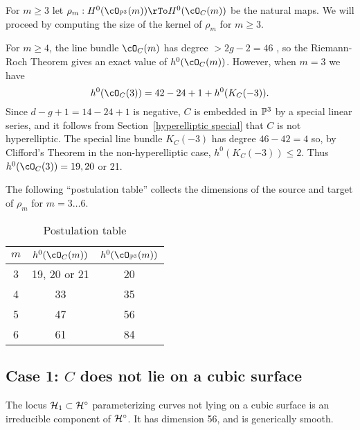 For $m\geq 3$ let
$
\rho_m : H^0(\cO_{\PP^3}(m)) \rTo H^0(\cO_C(m))
$
be the natural maps.
We will proceed by computing the size of the kernel of $\rho_m$ for $m\geq 3$.

For $m \geq 4$, the line bundle $\cO_C(m)$ has degree $>2g-2 = 46$ , so the Riemann-Roch Theorem gives an exact value of $h^0(\cO_C(m))$.
However, when $m= 3$ we have 
$$
h^0(\cO_C(3)) = 42-24+1+h^0(K_C(-3)).
$$
Since $d-g+1 = 14-24+1$ is negative, $C$ is embedded in $\PP^3$ by a special linear series, and it follows from Section~\ref{hyperelliptic special} that $C$ is not hyperelliptic. The special line bundle $K_C(-3)$ has degree $46-42 = 4$ so,
by Clifford's Theorem in the non-hyperelliptic case, $h^0(K_C(-3)) \leq 2$. Thus $h^0(\cO_C(3)) = 19, 20$ or 21.

 The following ``postulation table''
collects the dimensions of the source and target of  $\rho_m$ for $m = 3\dots 6$. 
\begin{table}
\begin{center}\begin{tabular}{ c | c | c }
 $m$ & $h^0(\cO_C(m))$ & $h^0(\cO_{\PP^3}(m))$ \\
 \hline
 3 & 19, 20 or 21 & 20 \\
 4 & 33 & 35 \\
 5 & 47 & 56 \\
 6 & 61 & 84
\end{tabular}
\end{center}
\caption{Postulation table\label{postulation table}}
\end{table}

\subsection{Case 1: $C$ does not lie on a cubic surface}

\begin{proposition}
The locus $\cH_1 \subset \cH^\circ$ parameterizing curves not lying on a cubic surface is an irreducible component of  $\cH^\circ$. It has dimension 56, and is generically smooth.
\end{proposition} 
 
